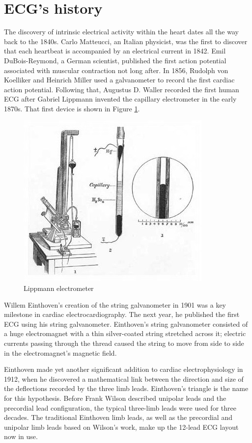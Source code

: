 \section{ECG's history} \label{ecg_history}

The discovery of intrinsic electrical activity within the heart dates all the way back to the 1840s. Carlo Matteucci, an Italian physicist, was the first to discover that each heartbeat is accompanied by an electrical current in 1842. Emil DuBois-Reymond, a German scientist, published the first action potential associated with muscular contraction not long after. In 1856, Rudolph von Koelliker and Heinrich Miller used a galvanometer to record the first cardiac action potential. Following that, Augustus D. Waller recorded the first human ECG after Gabriel Lippmann invented the capillary electrometer in the early 1870s. That first device is shown in Figure \ref{fig:Kapillarelektrometer}.

\begin{figure}[H]
\centering
\includegraphics[scale=0.5]{img/Kapillarelektrometer.jpg}
\caption{Lippmann electrometer}
\label{fig:Kapillarelektrometer}
\end{figure}

Willem Einthoven's creation of the string galvanometer in 1901 was a key milestone in cardiac electrocardiography. The next year, he published the first ECG using his string galvanometer. Einthoven's string galvanometer consisted of a huge electromagnet with a thin silver-coated string stretched across it; electric currents passing through the thread caused the string to move from side to side in the electromagnet's magnetic field.


Einthoven made yet another significant addition to cardiac electrophysiology in 1912, when he discovered a mathematical link between the direction and size of the deflections recorded by the three limb leads. Einthoven's triangle is the name for this hypothesis. Before Frank Wilson described unipolar leads and the precordial lead configuration, the typical three-limb leads were used for three decades. The traditional Einthoven limb leads, as well as the precordial and unipolar limb leads based on Wilson's work, make up the 12-lead ECG layout now in use.


